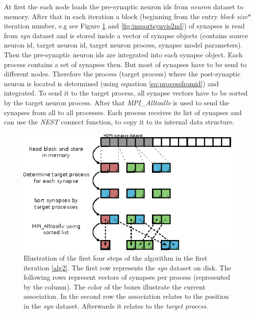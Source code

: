 At first the each node loads the pre-synaptic neuron ids from \emph{neuron} dataset to memory.
After that in each iteration a block (beginning from the entry \emph{block size}$*$ iteration number,
e.g see Figure \ref{fig:importsynvis} and \ref{fig:importsynvis2nd}) of synapses is read from \emph{syn} dataset and
is stored inside a vector of synapse objects
(contains source neuron id, target neuron id, target neuron process, synapse model parameters).
Then the pre-synaptic neuron ids are integrated into each synapse object.
Each process contains a set of synapses then.
But most of synapses have to be send to different nodes.
Therefore the process (target process) where the post-synaptic neuron is located is determined (using equation \ref{eq:processfromid})
and integrated.
To send it to the target process, all synapse vectors have to be sorted by the target neuron process.
After that \emph{MPI\_Alltoallv} is used to send the synapses from all to all processes.
Each process receives its list of synapses and can use the \emph{NEST} connect function, to copy it to its internal data structure.
\begin{figure}[ht!]
\centering
\includegraphics[scale=2.0]{pictures/import_syn_vis.eps}
\caption{Illustration of the first four steps of the algorithm in the first iteration \ref{alg2}.
The first row represents the \emph{syn} dataset on disk.
The following rows represent vectors of synapses per process (represented by the column).
The color of the boxes illustrate the current association.
In the second row the association relates to the position in the \emph{syn} dataset.
Afterwards it relates to the \emph{target process}.
}
\label{fig:importsynvis}
\end{figure}


